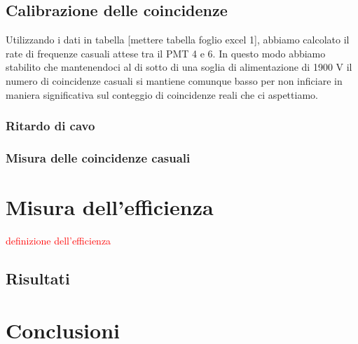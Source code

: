 \documentclass[a4paper,10pt]{article}
\newcommand{\note}[1]{\textcolor{red}{#1}}
\begin{document}
\subsection{Calibrazione delle coincidenze}
Utilizzando i dati in tabella [mettere tabella foglio excel 1], abbiamo calcolato il rate di frequenze casuali attese tra il PMT 4 e 6. In questo modo abbiamo stabilito che mantenendoci al di sotto di una soglia di alimentazione di 1900 V il numero di coincidenze casuali si mantiene comunque basso per non inficiare in maniera significativa sul conteggio di coincidenze reali che ci aspettiamo.

\subsubsection{Ritardo di cavo}

\subsubsection{Misura delle coincidenze casuali}


\section{Misura dell'efficienza}
\note{definizione dell'efficienza}
\subsection{Risultati}
\label{sec:efficienza} 


\section{Conclusioni}









\end{document}
